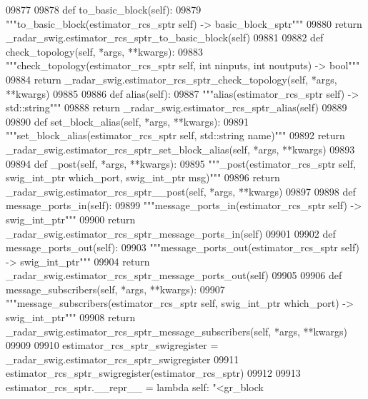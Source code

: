 \begin{DoxyCode}
{{{{{{{{{{{{{{{{{{{{{{{{{{{{{{{09877 
09878     \textcolor{keyword}{def }to_basic_block(self):
09879         \textcolor{stringliteral}{"""to\_basic\_block(estimator\_rcs\_sptr self) -> basic\_block\_sptr"""}
09880         \textcolor{keywordflow}{return} \_radar\_swig.estimator\_rcs\_sptr\_to\_basic\_block(self)
09881 
09882     \textcolor{keyword}{def }check_topology(self, *args, **kwargs):
09883         \textcolor{stringliteral}{"""check\_topology(estimator\_rcs\_sptr self, int ninputs, int noutputs) -> bool"""}
09884         \textcolor{keywordflow}{return} \_radar\_swig.estimator\_rcs\_sptr\_check\_topology(self, *args, **kwargs)
09885 
09886     \textcolor{keyword}{def }alias(self):
09887         \textcolor{stringliteral}{"""alias(estimator\_rcs\_sptr self) -> std::string"""}
09888         \textcolor{keywordflow}{return} \_radar\_swig.estimator\_rcs\_sptr\_alias(self)
09889 
09890     \textcolor{keyword}{def }set_block_alias(self, *args, **kwargs):
09891         \textcolor{stringliteral}{"""set\_block\_alias(estimator\_rcs\_sptr self, std::string name)"""}
09892         \textcolor{keywordflow}{return} \_radar\_swig.estimator\_rcs\_sptr\_set\_block\_alias(self, *args, **kwargs)
09893 
09894     \textcolor{keyword}{def }_post(self, *args, **kwargs):
09895         \textcolor{stringliteral}{"""\_post(estimator\_rcs\_sptr self, swig\_int\_ptr which\_port, swig\_int\_ptr msg)"""}
09896         \textcolor{keywordflow}{return} \_radar\_swig.estimator\_rcs\_sptr\_\_post(self, *args, **kwargs)
09897 
09898     \textcolor{keyword}{def }message_ports_in(self):
09899         \textcolor{stringliteral}{"""message\_ports\_in(estimator\_rcs\_sptr self) -> swig\_int\_ptr"""}
09900         \textcolor{keywordflow}{return} \_radar\_swig.estimator\_rcs\_sptr\_message\_ports\_in(self)
09901 
09902     \textcolor{keyword}{def }message_ports_out(self):
09903         \textcolor{stringliteral}{"""message\_ports\_out(estimator\_rcs\_sptr self) -> swig\_int\_ptr"""}
09904         \textcolor{keywordflow}{return} \_radar\_swig.estimator\_rcs\_sptr\_message\_ports\_out(self)
09905 
09906     \textcolor{keyword}{def }message_subscribers(self, *args, **kwargs):
09907         \textcolor{stringliteral}{"""message\_subscribers(estimator\_rcs\_sptr self, swig\_int\_ptr which\_port) -> swig\_int\_ptr"""}
09908         \textcolor{keywordflow}{return} \_radar\_swig.estimator\_rcs\_sptr\_message\_subscribers(self, *args, **kwargs)
09909 
09910 estimator\_rcs\_sptr\_swigregister = \_radar\_swig.estimator\_rcs\_sptr\_swigregister
09911 estimator_rcs_sptr_swigregister(estimator\_rcs\_sptr)
09912 
09913 estimator\_rcs\_sptr.\_\_repr\_\_ = \textcolor{keyword}{lambda} self: \textcolor{stringliteral}{"<gr\_block %
}}}}}}}}}}}}}}}}}}}}}}}}}}}}}}}}
\end{DoxyCode}

